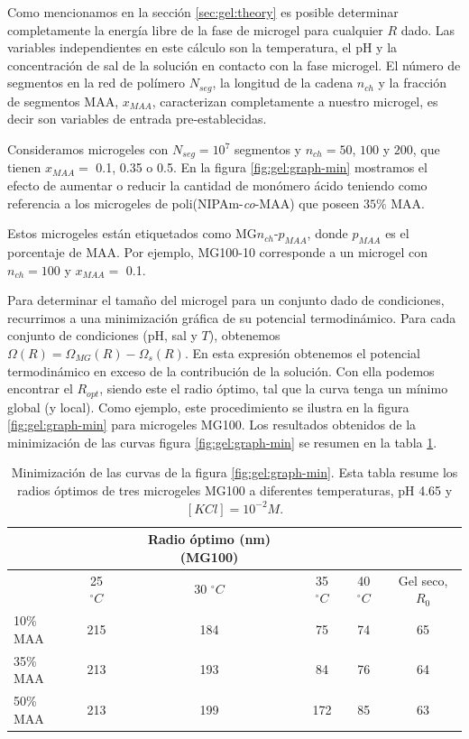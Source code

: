 Como mencionamos en la secci\'on \ref{sec:gel:theory} es posible determinar completamente la energ\'ia libre de la fase de microgel para cualquier $R$ dado.
Las variables independientes en este c\'alculo son la temperatura, el pH y la concentraci\'on de sal de la soluci\'on en contacto con la fase microgel.
El n\'umero de segmentos en la red de pol\'imero $N_{seg}$, la longitud de la cadena $n_{ch}$ y la fracci\'on de segmentos MAA, $x_{MAA}$, caracterizan completamente a nuestro microgel, es decir son variables de entrada pre-establecidas.


Consideramos microgeles con $N_{seg}=10^7$ segmentos y $n_{ch}=50$, $100$ y $200$, que tienen $x_{MAA}=$ 0.1, 0.35 o 0.5.
En la figura \ref{fig:gel:graph-min} mostramos el efecto de aumentar o reducir la cantidad de mon\'omero \'acido teniendo como referencia a los microgeles de poli(NIPAm-\emph{co}-MAA) que poseen $35\%$ MAA.

Estos microgeles est\'an etiquetados como MG$n_{ch}$-$p_{MAA}$, donde $p_{MAA}$ es el porcentaje de MAA.
Por ejemplo, MG100-10 corresponde a un  microgel con $n_{ch}=100$ y $x_{MAA}=$ 0.1.


Para determinar el tama\~no del microgel para un conjunto dado de condiciones, recurrimos a una minimizaci\'on gr\'afica de su potencial termodin\'amico.
Para cada conjunto de condiciones (pH, sal y $T$), obtenemos  $\Omega(R)=\Omega_{MG}(R)-\Omega_{s}(R)$. En esta expresi\'on obtenemos el potencial termodin\'amico en exceso de la contribuci\'on de la soluci\'on.
Con ella podemos encontrar el $R_{opt }$, siendo este el radio \'optimo, tal que la curva tenga un m\'inimo global (y local).
Como ejemplo, este procedimiento se ilustra en la figura \ref{fig:gel:graph-min} para microgeles MG100.
Los resultados obtenidos de la minimizaci\'on de las curvas figura \ref{fig:gel:graph-min} se resumen en la tabla \ref{table:gel:optimal-R}.

\begin{table}[!htb]
\centering
\small
  \begin{tabular}{|lccccc|}
   \hline %
    	&&   Radio \'optimo (nm)(MG100) & && \\
    	\hline
      & {25 $^\circ C$} & {30 $^\circ C$} & {35 $^\circ C$} & {40 $^\circ C$} & {Gel seco, $R_0$} \\
      \hline
    10\% MAA & 215 &  184 &  75  &  74 & 65\\
    35\% MAA &  213 &  193 &  84 & 76 & 64\\
    50\% MAA &  213 & 199 &  172 & 85 & 63\\
    \hline
  \end{tabular}
 \caption{Minimizaci\'on de las curvas de la  figura \ref{fig:gel:graph-min}.
 	Esta tabla resume los radios \'optimos de tres microgeles MG100 a diferentes temperaturas, pH 4.65 y $[KCl]=10^{-2}M$.}
\label{table:gel:optimal-R} 
\end{table}


